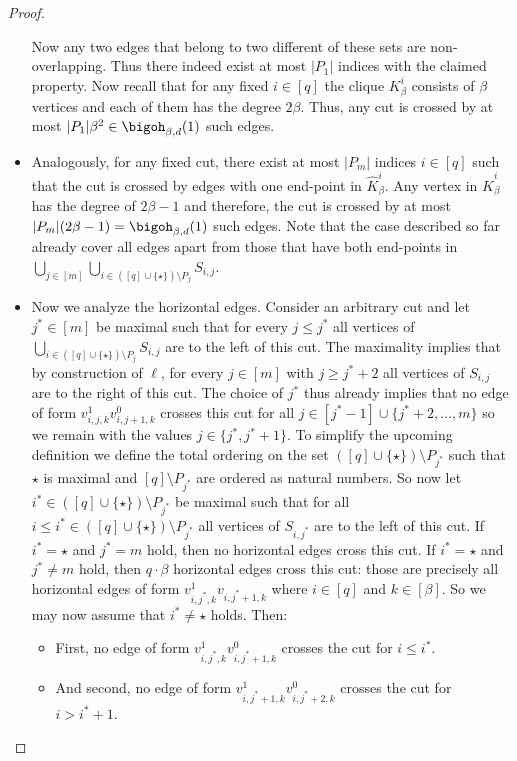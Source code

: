 \documentclass[a4paper,UKenglish,cleveref, autoref, thm-restate]{lipics-v2021}
\begin{document}
\begin{proof}
\begin{itemize}
\[		\]
		Now any two edges that belong to two different of these sets are non-overlapping.
		Thus there indeed exist at most $|P_1|$ indices with the claimed property.
		Now recall that for any fixed $i \in [q]$ the clique $K_{\beta}^i$ consists of $\beta$ vertices and each of them has the degree $2 \beta$.
		Thus, any cut is crossed by at most $|P_1| \beta^2 \in \bigoh_{\beta, d}(1)$ such edges.
		\item Analogously, for any fixed cut, there exist at most $|P_m|$ indices $i \in [q]$ such that the cut is crossed by edges with one end-point in $\hat{K}_\beta^i$.
		Any vertex in $\hat{K}_\beta^i$ has the degree of $2 \beta - 1$ and therefore, the cut is crossed by at most $|P_m| (2 \beta - 1) = \bigoh_{\beta, d}(1)$ such edges. 
		Note that the case described so far already cover all edges apart from those that have both end-points in $\bigcup_{j \in [m]} \bigcup_{i \in ([q] \cup \{\star\}) \setminus P_j} S_{i,j}$.
		\item Now we analyze the horizontal edges.
		Consider an arbitrary cut and let $j^* \in [m]$ be maximal such that for every $j \leq j^*$ all vertices of $\bigcup_{i \in ([q] \cup \{\star\}) \setminus P_j} S_{i, j}$ are to the left of this cut.
		The maximality implies that by construction of $\ell$, for every $j \in [m]$ with $j \geq j^*+2$ all vertices of $S_{i,j}$ are to the right of this cut.
		The choice of $j^*$ thus already implies that no edge of form $v_{i, j, k}^1 v_{i, j+1, k}^0$ crosses this cut for all $j \in [j^*-1] \cup \{j^*+2, \dots, m\}$ so we remain with the values $j \in \{j^*, j^*+1\}$.
		To simplify the upcoming definition we define the total ordering on the set $([q]  \cup \{\star\}) \setminus P_{j^*}$ such that $\star$ is maximal and $[q] \setminus P_{j^*}$ are ordered as natural numbers.
		So now let $i^* \in ([q] \cup \{\star\}) \setminus P_{j^*}$ be maximal such that for all $i \leq i^* \in ([q] \cup \{\star\}) \setminus P_{j^*}$ all vertices of $S_{i, j^*}$ are to the left of this cut.
		If $i^* = \star$ and $j^* = m$ hold, then no horizontal edges cross this cut.
		If $i^* = \star$ and $j^* \neq m$ hold, then 
		$q \cdot \beta$ horizontal edges cross this cut: those are precisely all horizontal edges of form $v_{i,j^*,k}^1 v_{i,j^*+1,k}$ where $i \in [q]$ and $k \in [\beta]$. 
		So we may now assume that $i^* \neq \star$ holds.
		Then:
		\begin{itemize}
			\item First, no edge of form $v_{i,j^*,k}^1 v_{i,j^*+1,k}^0$ crosses the cut for $i \leq i^*$.
			\item And second, no edge of form $v_{i,j^*+1,k}^1 v_{i,j^*+2,k}^0$ crosses the cut for $i > i^* + 1$.

\end{itemize}
\end{itemize}
\end{proof}
\end{document}
